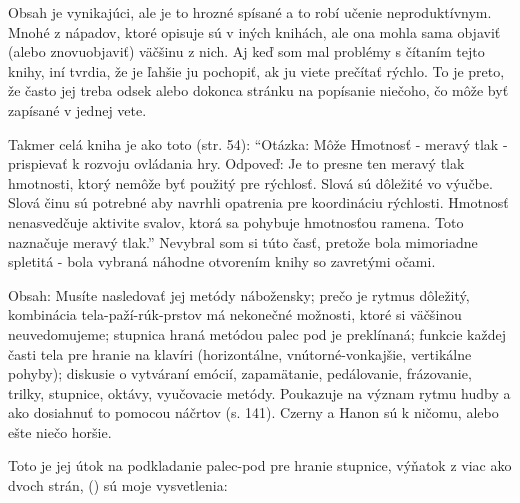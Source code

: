 Obsah je vynikajúci, ale je to hrozné spísané a to robí učenie neproduktívnym. Mnohé z nápadov, ktoré opisuje sú v iných knihách, ale ona mohla sama objaviť (alebo znovuobjaviť) väčšinu z nich. Aj keď som mal problémy s čítaním tejto knihy, iní tvrdia, že je ľahšie ju pochopiť, ak ju viete prečítať rýchlo. To je preto, že často jej treba odsek alebo dokonca stránku na popísanie niečoho, čo môže byť zapísané v jednej vete. 

Takmer celá kniha je ako toto (str. 54): “Otázka: Môže Hmotnosť - meravý tlak - prispievať k rozvoju ovládania hry. Odpoveď: Je to presne ten meravý tlak hmotnosti, ktorý nemôže byť použitý pre rýchlosť. Slová sú dôležité vo výučbe. Slová činu sú potrebné aby navrhli opatrenia pre koordináciu rýchlosti. Hmotnosť nenasvedčuje aktivite svalov, ktorá sa pohybuje hmotnosťou ramena. Toto naznačuje meravý tlak.” Nevybral som si túto časť, pretože bola mimoriadne spletitá - bola vybraná náhodne otvorením knihy so zavretými očami. 

Obsah: Musíte nasledovať jej metódy nábožensky; prečo je rytmus dôležitý, kombinácia tela-paží-rúk-prstov má nekonečné možnosti, ktoré si väčšinou neuvedomujeme; stupnica hraná metódou palec pod je preklínaná; funkcie každej časti tela pre hranie na klavíri (horizontálne, vnútorné-vonkajšie, vertikálne pohyby); diskusie o vytváraní emócií, zapamätanie, pedálovanie, frázovanie, trilky, stupnice, oktávy, vyučovacie metódy. Poukazuje na význam rytmu hudby a ako dosiahnuť to pomocou náčrtov (s. 141). Czerny a Hanon sú k ničomu, alebo ešte niečo horšie. 

Toto je jej útok na podkladanie palec-pod pre hranie stupnice, výňatok z viac ako dvoch strán, () sú moje vysvetlenia: 

